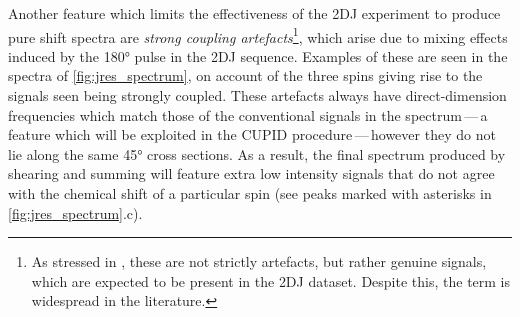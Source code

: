 Another feature which limits the effectiveness of the \ac{2DJ} experiment to
produce pure shift spectra are
\emph{strong coupling artefacts}\footnote{
    As stressed in \cite{Thrippleton2005}, these are not strictly artefacts,
    but rather genuine signals, which are expected to be present in the
    \ac{2DJ} dataset. Despite this, the term is widespread in the literature.
},
which arise due to mixing effects induced by the \ang{180} pulse in the
\ac{2DJ} sequence\cite{Wider1983,Thrippleton2005}. Examples of these are seen
in the spectra of \cref{fig:jres_spectrum}, on account of the three spins
giving rise to the signals seen being strongly coupled. These artefacts always
have direct-dimension frequencies which match those of the conventional signals
in the spectrum\,---\,a feature which will be exploited in the \ac{CUPID}
procedure\,---\,however they do not lie along the same \ang{45} cross
sections. As a result, the final spectrum produced by shearing and summing will
feature extra low intensity signals that do not agree with the chemical shift
of a particular spin (see peaks marked with asterisks in
\cref{fig:jres_spectrum}.c).

